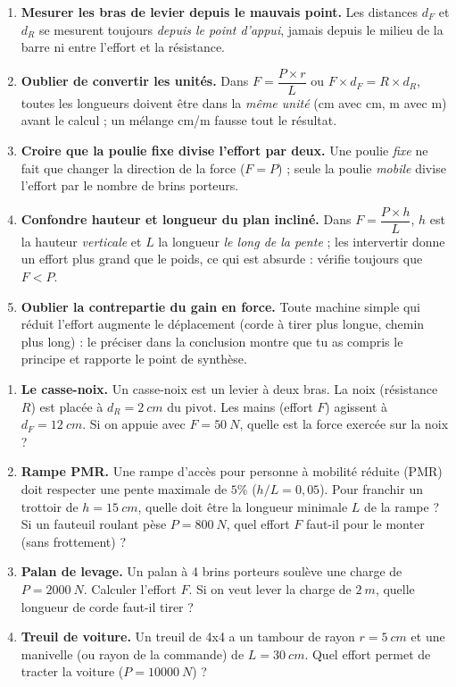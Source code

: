 \documentclass[11pt]{article}
\begin{document}
\begin{attention}
\begin{enumerate}
\item \textbf{Mesurer les bras de levier depuis le mauvais point.} Les distances $d_F$ et $d_R$ se mesurent toujours \emph{depuis le point d'appui}, jamais depuis le milieu de la barre ni entre l'effort et la résistance.
\item \textbf{Oublier de convertir les unités.} Dans $F = \dfrac{P \times r}{L}$ ou $F \times d_F = R \times d_R$, toutes les longueurs doivent être dans la \emph{même unité} (cm avec cm, m avec m) avant le calcul ; un mélange cm/m fausse tout le résultat.
\item \textbf{Croire que la poulie fixe divise l'effort par deux.} Une poulie \emph{fixe} ne fait que changer la direction de la force ($F = P$) ; seule la poulie \emph{mobile} divise l'effort par le nombre de brins porteurs.
\item \textbf{Confondre hauteur et longueur du plan incliné.} Dans $F = \dfrac{P \times h}{L}$, $h$ est la hauteur \emph{verticale} et $L$ la longueur \emph{le long de la pente} ; les intervertir donne un effort plus grand que le poids, ce qui est absurde : vérifie toujours que $F < P$.
\item \textbf{Oublier la contrepartie du gain en force.} Toute machine simple qui réduit l'effort augmente le déplacement (corde à tirer plus longue, chemin plus long) : le préciser dans la conclusion montre que tu as compris le principe et rapporte le point de synthèse.
\end{enumerate}
\end{attention}

\begin{exercice}
\begin{enumerate}
\item \textbf{Le casse-noix.} Un casse-noix est un levier à deux bras. La noix (résistance $R$) est placée à $d_R = \SI{2}{cm}$ du pivot. Les mains (effort $F$) agissent à $d_F = \SI{12}{cm}$. Si on appuie avec $F = \SI{50}{N}$, quelle est la force exercée sur la noix ?
\item \textbf{Rampe PMR.} Une rampe d'accès pour personne à mobilité réduite (PMR) doit respecter une pente maximale de $5\%$ ($h/L = 0,05$). Pour franchir un trottoir de $h = \SI{15}{cm}$, quelle doit être la longueur minimale $L$ de la rampe ? Si un fauteuil roulant pèse $P = \SI{800}{N}$, quel effort $F$ faut-il pour le monter (sans frottement) ?
\item \textbf{Palan de levage.} Un palan à 4 brins porteurs soulève une charge de $P = \SI{2000}{N}$. Calculer l'effort $F$. Si on veut lever la charge de $\SI{2}{m}$, quelle longueur de corde faut-il tirer ?
\item \textbf{Treuil de voiture.} Un treuil de 4x4 a un tambour de rayon $r = \SI{5}{cm}$ et une manivelle (ou rayon de la commande) de $L = \SI{30}{cm}$. Quel effort permet de tracter la voiture ($P = \SI{10000}{N}$) ?
\end{enumerate}
\end{exercice}
\end{document}
